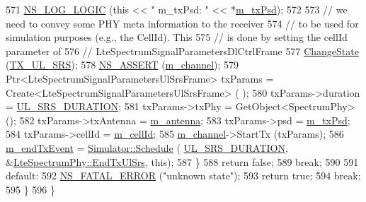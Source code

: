 \begin{DoxyCode}
571       \hyperlink{group__logging_ga88acd260151caf2db9c0fc84997f45ce}{NS\_LOG\_LOGIC} (\textcolor{keyword}{this} << \textcolor{stringliteral}{" m\_txPsd: "} << *\hyperlink{classns3_1_1LteSpectrumPhy_a5db966e9422290886f779dbbf1cbd146}{m\_txPsd});
572       
573       \textcolor{comment}{// we need to convey some PHY meta information to the receiver}
574       \textcolor{comment}{// to be used for simulation purposes (e.g., the CellId). This}
575       \textcolor{comment}{// is done by setting the cellId parameter of }
576       \textcolor{comment}{// LteSpectrumSignalParametersDlCtrlFrame}
577       \hyperlink{classns3_1_1LteSpectrumPhy_a64a105b7c580b3d6dc5cd4b97d1223d9}{ChangeState} (\hyperlink{classns3_1_1LteSpectrumPhy_a52ce2cf9b4846807449c50399f6b8000ac5787701c401b89263d16c318892f1c0}{TX\_UL\_SRS});
578       \hyperlink{assert_8h_a6dccdb0de9b252f60088ce281c49d052}{NS\_ASSERT} (\hyperlink{classns3_1_1LteSpectrumPhy_a83821e104a67268a379c06cfe65f7417}{m\_channel});
579       Ptr<LteSpectrumSignalParametersUlSrsFrame> txParams = Create<LteSpectrumSignalParametersUlSrsFrame> (
      );
580       txParams->duration = \hyperlink{namespacens3_af053019d8f8129f6aef84bf3a466ed40}{UL\_SRS\_DURATION};
581       txParams->txPhy = GetObject<SpectrumPhy> ();
582       txParams->txAntenna = \hyperlink{classns3_1_1LteSpectrumPhy_a99c269c50198172fecd23b2eab9da193}{m\_antenna};
583       txParams->psd = \hyperlink{classns3_1_1LteSpectrumPhy_a5db966e9422290886f779dbbf1cbd146}{m\_txPsd};
584       txParams->cellId = \hyperlink{classns3_1_1LteSpectrumPhy_a996732fedbe320aedd9d2def1fc6e3c7}{m\_cellId};
585       \hyperlink{classns3_1_1LteSpectrumPhy_a83821e104a67268a379c06cfe65f7417}{m\_channel}->StartTx (txParams);
586       \hyperlink{classns3_1_1LteSpectrumPhy_a95011c60fa2c99a9295f7ab4420014c0}{m\_endTxEvent} = \hyperlink{classns3_1_1Simulator_a671882c894a08af4a5e91181bf1eec13}{Simulator::Schedule} (
      \hyperlink{namespacens3_af053019d8f8129f6aef84bf3a466ed40}{UL\_SRS\_DURATION}, &\hyperlink{classns3_1_1LteSpectrumPhy_a7d2b8ee31f4ba86eb824da94fd2f6a34}{LteSpectrumPhy::EndTxUlSrs}, \textcolor{keyword}{this});
587     \}
588     \textcolor{keywordflow}{return} \textcolor{keyword}{false};
589     \textcolor{keywordflow}{break};
590     
591     \textcolor{keywordflow}{default}:
592       \hyperlink{group__fatal_ga5131d5e3f75d7d4cbfd706ac456fdc85}{NS\_FATAL\_ERROR} (\textcolor{stringliteral}{"unknown state"});
593       \textcolor{keywordflow}{return} \textcolor{keyword}{true};
594       \textcolor{keywordflow}{break};
595   \}
596 \}
\end{DoxyCode}


